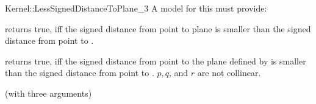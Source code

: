 \begin{ccRefFunctionObjectConcept}{Kernel::LessSignedDistanceToPlane_3}
A model for this must provide:


{returns true, iff the signed distance from point  to plane 
 is smaller than the signed distance from point  to .}

{returns true, iff the signed distance from point  to the plane
 defined by  is smaller than the signed distance 
from point  to .
\ccPrecond $p, q$, and $r$ are not collinear.}

\ccRefines
{} (with three arguments)

\ccSeeAlso
{}\\

\end{ccRefFunctionObjectConcept}
